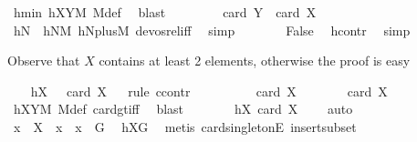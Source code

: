 \begin{isabellebody}
\ hmin\ hXYM\ M{\isacharunderscore}{\kern0pt}def\ \isamarkupfalse%
\ blast\isanewline
\ \ \ \ \isamarkupfalse%
\ \isamarkupfalse%
\ {\isachardoublequoteopen}{\isasymnot}\ card\ Y\ {\isacharless}{\kern0pt}\ card\ X{\isachardoublequoteclose}\ \isamarkupfalse%
\ hN\ \ hNM\ hNplusM\ devos{\isacharunderscore}{\kern0pt}rel{\isacharunderscore}{\kern0pt}iff\ \isamarkupfalse%
\ simp\isanewline
\ \ \ \ \isamarkupfalse%
\ \isamarkupfalse%
\ False\ \isamarkupfalse%
\ hcontr\ \isamarkupfalse%
\ simp\isanewline
\ \ \isamarkupfalse%
%
\begin{isamarkuptext}%
Observe that $X$ contains at least 2 elements, otherwise the proof is easy%
\end{isamarkuptext}\isamarkuptrue%
\ \ \isamarkupfalse%
\ hX{}{\isacharcolon}{\kern0pt}\ {\isachardoublequoteopen}{}\ {\isasymle}\ card\ X{\isachardoublequoteclose}\isanewline
\ \ \isamarkupfalse%
{\isacharparenleft}{\kern0pt}rule\ ccontr{\isacharparenright}{\kern0pt}\isanewline
\ \ \ \ \isamarkupfalse%
\ {\isachardoublequoteopen}\ {\isasymnot}\ {}\ {\isasymle}\ card\ X{\isachardoublequoteclose}\isanewline
\ \ \ \ \isamarkupfalse%
\ \isamarkupfalse%
\ {\isachardoublequoteopen}card\ X\ {\isachargreater}{\kern0pt}\ {}{\isachardoublequoteclose}\ \isamarkupfalse%
\ hXYM\ M{\isacharunderscore}{\kern0pt}def\ card{\isacharunderscore}{\kern0pt}gt{\isacharunderscore}{\kern0pt}{}{\isacharunderscore}{\kern0pt}iff\ \isamarkupfalse%
\ blast\isanewline
\ \ \ \ \isamarkupfalse%
\ \isamarkupfalse%
\ hX{}{\isacharcolon}{\kern0pt}\ {\isachardoublequoteopen}card\ X\ {\isacharequal}{\kern0pt}\ {}{\isachardoublequoteclose}\ \isamarkupfalse%
\ auto\isanewline
\ \ \ \ \isamarkupfalse%
\ \isamarkupfalse%
\ x\ \ {\isachardoublequoteopen}X\ {\isacharequal}{\kern0pt}\ {\isacharbraceleft}{\kern0pt}x{\isacharbraceright}{\kern0pt}{\isachardoublequoteclose}\ \ {\isachardoublequoteopen}x\ {\isasymin}\ G{\isachardoublequoteclose}\ \isamarkupfalse%
\ hXG\ \isamarkupfalse%
\ {\isacharparenleft}{\kern0pt}metis\ card{\isacharunderscore}{\kern0pt}{}{\isacharunderscore}{\kern0pt}singletonE\ insert{\isacharunderscore}{\kern0pt}subset{\isacharparenright}{\kern0pt}\isanewline

\end{isabellebody}
